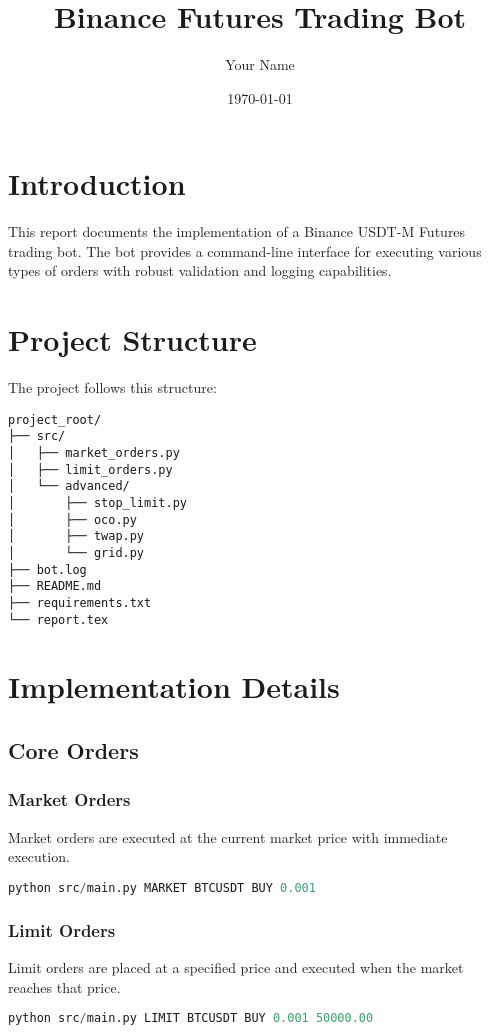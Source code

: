 \documentclass[12pt,a4paper]{article}
\title{\textbf{Binance Futures Trading Bot}}
\author{Your Name}
\date{\today}
\begin{document}
\maketitle
\tableofcontents
\newpage

\section{Introduction}
This report documents the implementation of a Binance USDT-M Futures trading bot. The bot provides a command-line interface for executing various types of orders with robust validation and logging capabilities.

\section{Project Structure}
The project follows this structure:
\begin{verbatim}
project_root/
├── src/
│   ├── market_orders.py
│   ├── limit_orders.py
│   └── advanced/
│       ├── stop_limit.py
│       ├── oco.py
│       ├── twap.py
│       └── grid.py
├── bot.log
├── README.md
├── requirements.txt
└── report.tex
\end{verbatim}

\section{Implementation Details}

\subsection{Core Orders}
\subsubsection{Market Orders}
Market orders are executed at the current market price with immediate execution.

\begin{lstlisting}[language=Python, caption=Market Order Example]
python src/main.py MARKET BTCUSDT BUY 0.001
\end{lstlisting}

\subsubsection{Limit Orders}
Limit orders are placed at a specified price and executed when the market reaches that price.

\begin{lstlisting}[language=Python, caption=Limit Order Example]
python src/main.py LIMIT BTCUSDT BUY 0.001 50000.00
\end{lstlisting}
\end{document}
